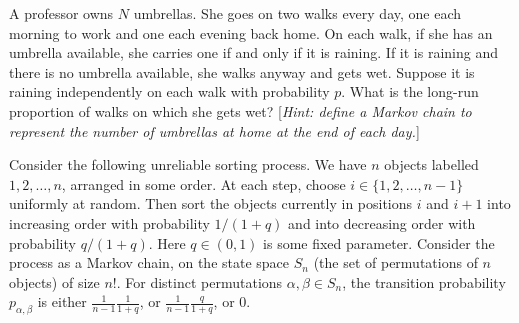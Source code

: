 \documentclass[answers]{exam}
\begin{document}
\begin{questions}
\question%
A professor owns $N$ umbrellas. She goes on two walks every day, one each morning to work and one each evening back home. On each walk, if she has an umbrella available, she carries one if and only if it is raining. If it is raining and there is no umbrella available, she walks anyway and gets wet. Suppose it is raining independently on each walk with probability $p$. What is the long-run proportion of walks on which she gets wet? [\emph{Hint: define a Markov chain to represent the number of umbrellas at home at the end of each day.}]



\question%
Consider the following unreliable sorting process. We have $n$ objects labelled $1,2, \ldots, n$, arranged in some order. At each step, choose $i \in\{1,2, \ldots, n-1\}$ uniformly at random. Then sort the objects currently in positions $i$ and $i+1$ into increasing order with probability $1 /(1+q)$ and into decreasing order with probability $q /(1+q)$. Here $q \in(0,1)$ is some fixed parameter. Consider the process as a Markov chain, on the state space $S_{n}$ (the set of permutations of $n$ objects) of size $n!$. For distinct permutations $\alpha, \beta \in S_{n}$, the transition probability $p_{\alpha, \beta}$ is either $\frac{1}{n-1} \frac{1}{1+q}$, or $\frac{1}{n-1} \frac{q}{1+q}$, or 0.
\end{questions}
\end{document}
